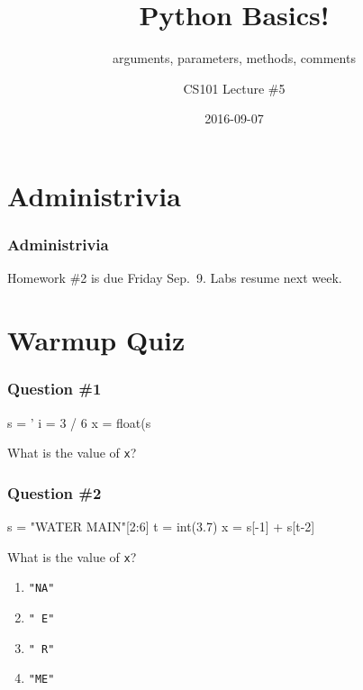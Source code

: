 \documentclass[11pt]{beamer}
\title{Python Basics!}
\subtitle{arguments, parameters, methods, comments}
\author{CS101 Lecture \#5}
\date{2016-09-07}
\begin{document}
  \setcounter{showProgressBar}{0}
  \setcounter{showSlideNumbers}{0}

\frame{\titlepage}

\setcounter{framenumber}{0}
\setcounter{showProgressBar}{1}
\setcounter{showSlideNumbers}{1}

\section{Administrivia}

\begin{frame}
  \frametitle{Administrivia}
  \Enlarge
  \begin{itemize}
  \myitem  Homework \#2 is due Friday Sep.\ 9.
  \myitem  Labs resume next week.
  \end{itemize}
\end{frame}

\section{Warmup Quiz}

\begin{frame}[fragile]
  \frametitle{Question \#1}
  \Enlarge

  \begin{semiverbatim}
s = '%
i = 3 / 6
x = float(s%
  \end{semiverbatim}
  What is the value of \texttt{x}?
\end{frame}

\begin{frame}[fragile]
  \frametitle{Question \#2}
  \Enlarge

  \begin{semiverbatim}
s = "WATER MAIN"[2:6]
t = int(3.7)
x = s[-1] + s[t-2]
  \end{semiverbatim}
  What is the value of \texttt{x}?
  \begin{enumerate}[label=\Alph*]
  \item  \texttt{"NA"}
  \item  \texttt{" E"}
  \item  \texttt{" R"}
  \item  \texttt{"ME"}
  \end{enumerate}
\end{frame}
\end{document}
